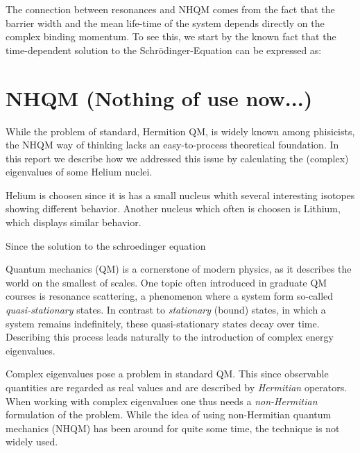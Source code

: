 The connection between resonances and NHQM comes from the fact that the barrier width and the mean life-time of the system depends directly on the complex binding momentum.
To see this, we start by the known fact that the time-dependent solution to the Schrödinger-Equation can be expressed as:



\section{NHQM (Nothing of use now...)}
While the problem of standard, Hermition QM, is widely known among phisicists, the NHQM way of thinking lacks an easy-to-process theoretical foundation.
In this report we describe how we addressed this issue by calculating the (complex) eigenvalues of some Helium nuclei.

Helium is choosen since it is has a small nucleus whith several interesting isotopes showing different behavior.
Another nucleus which often is choosen is Lithium, which displays similar behavior.

Since the solution to the schroedinger equation 








Quantum mechanics (QM) is a cornerstone of modern physics, as it describes the world on the smallest of scales.
One topic often introduced in graduate QM courses is resonance scattering, a phenomenon where a system form so-called \emph{quasi-stationary} states.
In contrast to \emph{stationary} (bound) states, in which a system remains indefinitely, these quasi-stationary states decay over time.
Describing this process leads naturally to the introduction of complex energy eigenvalues. 

Complex eigenvalues pose a problem in standard QM.
This since observable quantities are regarded as real values and are described by \emph{Hermitian} operators.
When working with complex eigenvalues one thus needs a \emph{non-Hermitian} formulation of the problem.
While the idea of using non-Hermitian quantum mechanics (NHQM) has been around for quite some time, the technique is not widely used.
